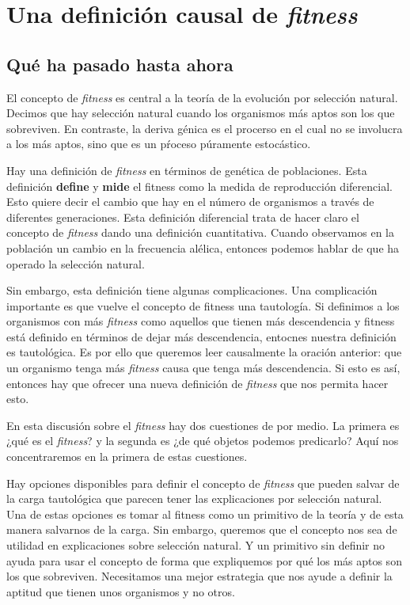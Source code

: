 
\chapter{Una definición causal de \emph{fitness}}

\section{Qué ha pasado hasta ahora}

\noindent El concepto de \emph{fitness} es central a la teoría de la evolución por selección natural. Decimos que hay selección natural cuando los organismos más aptos son los que sobreviven. En contraste, la deriva génica es el procerso en el cual no se involucra a los más aptos, sino que es un pŕoceso púramente estocástico.

Hay una definición de \emph{fitness} en términos de genética de poblaciones. Esta definición \textbf{define} y \textbf{mide} el fitness como la medida de reproducción diferencial. Esto quiere decir el cambio que hay en el número de organismos a través de diferentes generaciones. Esta definición diferencial trata de hacer claro el concepto de \emph{fitness} dando una definición cuantitativa. Cuando observamos en la población un cambio en la frecuencia alélica, entonces podemos hablar de que ha operado la selección natural.

Sin embargo, esta definición tiene algunas complicaciones. Una complicación importante es que vuelve el concepto de fitness una tautología. Si definimos a los organismos con más \emph{fitness} como aquellos que tienen más descendencia y fitness está definido en términos de dejar más descendencia, entocnes nuestra definición es tautológica. Es por ello que queremos leer causalmente la oración anterior: que un organismo tenga más \emph{fitness} causa que tenga más descendencia. Si esto es así, entonces hay que ofrecer una nueva definición de \emph{fitness} que nos permita hacer esto.

En esta discusión sobre el \emph{fitness} hay dos cuestiones de por medio. La primera es ¿qué es el \emph{fitness}? y la segunda es ¿de qué objetos podemos predicarlo? Aquí nos concentraremos  en la primera de estas cuestiones.

Hay opciones disponibles para definir el concepto de \emph{fitness} que pueden salvar de la carga tautológica que parecen tener las explicaciones por selección natural. Una de estas opciones es tomar al fitness como un primitivo de la teoría y de esta manera salvarnos de la carga. Sin embargo, queremos que el concepto nos sea de utilidad en explicaciones sobre selección natural. Y un primitivo sin definir no ayuda para usar el concepto de forma que expliquemos por qué los más aptos son los que sobreviven. Necesitamos una mejor estrategia que nos ayude a definir la aptitud que tienen unos organismos y no otros.

